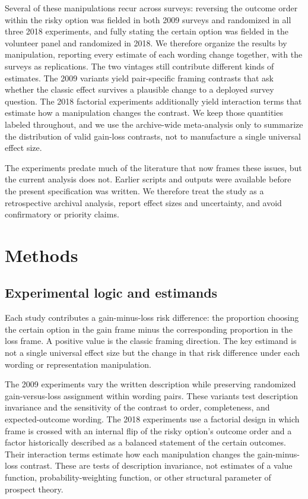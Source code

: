 \documentclass[11pt]{article}
\begin{document}
Several of these manipulations recur across surveys: reversing the outcome order within the risky option was fielded in both 2009 surveys and randomized in all three 2018 experiments, and fully stating the certain option was fielded in the volunteer panel and randomized in 2018. We therefore organize the results by manipulation, reporting every estimate of each wording change together, with the surveys as replications. The two vintages still contribute different kinds of estimates. The 2009 variants yield pair-specific framing contrasts that ask whether the classic effect survives a plausible change to a deployed survey question. The 2018 factorial experiments additionally yield interaction terms that estimate how a manipulation changes the contrast. We keep those quantities labeled throughout, and we use the archive-wide meta-analysis only to summarize the distribution of valid gain-loss contrasts, not to manufacture a single universal effect size.

The experiments predate much of the literature that now frames these issues, but the current analysis does not. Earlier scripts and outputs were available before the present specification was written. We therefore treat the study as a retrospective archival analysis, report effect sizes and uncertainty, and avoid confirmatory or priority claims.

\section{Methods}

\subsection{Experimental logic and estimands}

Each study contributes a gain-minus-loss risk difference: the proportion choosing the certain option in the gain frame minus the corresponding proportion in the loss frame. A positive value is the classic framing direction. The key estimand is not a single universal effect size but the change in that risk difference under each wording or representation manipulation.

The 2009 experiments vary the written description while preserving randomized gain-versus-loss assignment within wording pairs. These variants test description invariance and the sensitivity of the contrast to order, completeness, and expected-outcome wording. The 2018 experiments use a factorial design in which frame is crossed with an internal flip of the risky option's outcome order and a factor historically described as a balanced statement of the certain outcomes. Their interaction terms estimate how each manipulation changes the gain-minus-loss contrast. These are tests of description invariance, not estimates of a value function, probability-weighting function, or other structural parameter of prospect theory.
\end{document}
